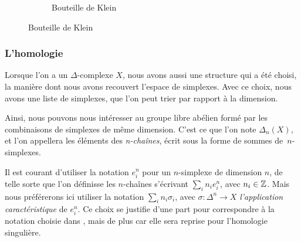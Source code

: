 \begin{exemple}
\begin{figure}[H]
\begin{subfigure}[t]{0.3\textwidth}
\centering
{}
\caption{Bouteille de Klein}
\label{tkz:klein-bottle}
\end{subfigure}
\end{figure}
\end{exemple}

\subsubsection{L'homologie}
Lorsque l'on a un $\Delta$-complexe $X$, nous avons aussi une structure qui a été choisi, la manière dont nous avons recouvert l'espace de simplexes. Avec ce choix, nous avons une liste de simplexes, que l'on peut trier par rapport à la dimension.

Ainsi, nous pouvons nous intéresser au groupe libre abélien formé par les combinaisons de simplexes de même dimension. C'est ce que l'on note $\Delta_n(X)$, et l'on appellera les éléments des \emph{n-chaînes}, écrit sous la forme de sommes de~$n$-simplexes.

\bigskip Il est courant d'utiliser la notation $e_i^n$ pour un $n$-simplexe de dimension $n$, de telle sorte que l'on définisse les $n$-chaînes s'écrivant $\sum_in_ie_i^n$, avec $n_i\in\mathbb{Z}$. Mais nous préférerons ici utiliser la notation $\sum_in_i\sigma_i$, avec $\sigma:\Delta^n\to X$ \emph{l'application caractéristique} de $e_i^n$. Ce choix se justifie d'une part pour correspondre à la notation choisie dans \cite{Hatcher}, mais de plus car elle sera reprise pour l'homologie singulière.

